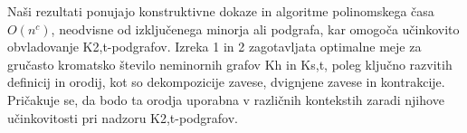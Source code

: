 \documentclass{article}
\begin{document}
Naši rezultati ponujajo konstruktivne dokaze in algoritme polinomskega časa $O(n^c)$, neodvisne od izključenega minorja ali podgrafa, kar omogoča učinkovito obvladovanje K2,t-podgrafov. Izreka 1 in 2 zagotavljata optimalne meje za gručasto kromatsko število neminornih grafov Kh in Ks,t, poleg ključno razvitih definicij in orodij, kot so dekompozicije zavese, dvignjene zavese in kontrakcije. Pričakuje se, da bodo ta orodja uporabna v različnih kontekstih zaradi njihove učinkovitosti pri nadzoru K2,t-podgrafov.
\end{document}
